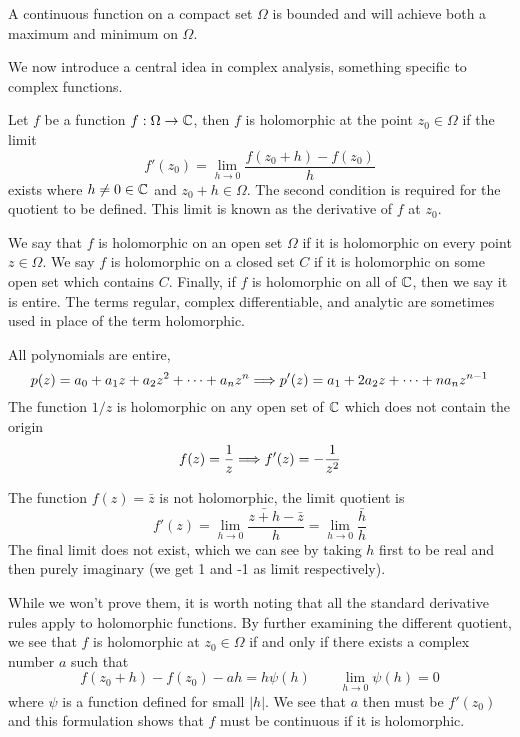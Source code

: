 \begin{theorem}
	A continuous function on a compact set $\Omega$ is bounded and will achieve both a maximum and minimum on $\Omega$. 
\end{theorem}

We now introduce a central idea in complex analysis, something specific to complex functions.

\begin{definition}
	Let $f$ be a function $f: \Omega \to \mathbb{C}$, then $f$ is holomorphic at the point $z_0 \in \Omega$ if the limit
	\[ f'(z_0) = \lim_{h \to 0} \frac{f(z_0 + h) - f(z_0)}{h} \]
	exists where $h \neq 0 \in \mathbb{C}$ and $z_0 + h \in \Omega$. The second condition is required for the quotient to be defined. This limit is known as the derivative of $f$ at $z_0$.
\end{definition}

We say that $f$ is holomorphic on an open set $\Omega$ if it is holomorphic on every point $z \in \Omega$. We say $f$ is holomorphic on a closed set $C$ if it is holomorphic on some open set which contains $C$. Finally, if $f$ is holomorphic on all of $\mathbb{C}$, then we say it is entire. The terms regular, complex differentiable, and analytic are sometimes used in place of the term holomorphic.

\begin{example}
	All polynomials are entire,
	\[ p(z) = a_0 + a_1z + a_2z^2 + \cdots + a_nz^n \Longrightarrow p'(z) = a_1 + 2a_2 z + \cdots + n a_nz^{n-1} \]
	The function $1/z$ is holomorphic on any open set of $\mathbb{C}$ which does not contain the origin
	\[ f(z) = \frac{1}{z} \Longrightarrow f'(z) = -\frac{1}{z^2} \]
\end{example}

\begin{example}
	The function $f(z) = \bar z$ is not holomorphic, the limit quotient is
	\[ f'(z) = \lim_{h \to 0} \frac{\bar{z + h} - \bar z}{h} = \lim_{h \to 0} \frac{\bar h}{h} \]
	The final limit does not exist, which we can see by taking $h$ first to be real and then purely imaginary (we get 1 and -1 as limit respectively).
\end{example}

While we won't prove them, it is worth noting that all the standard derivative rules apply to holomorphic functions. By further examining the different quotient, we see that $f$ is holomorphic at $z_0 \in \Omega$ if and only if there exists a complex number $a$ such that
\[ f(z_0 + h) - f(z_0) - ah = h \psi(h) \qquad \lim_{h \to 0} \psi(h) = 0 \]
where $\psi$ is a function defined for small $|h|$. We see that $a$ then must be $f'(z_0)$ and this formulation shows that $f$ must be continuous if it is holomorphic.


